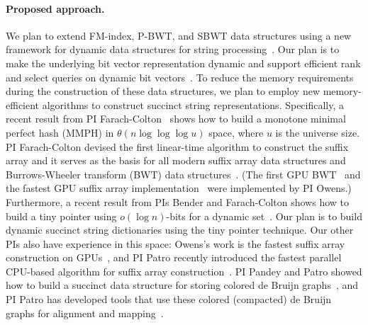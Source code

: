 \paragraph{Proposed approach.} We plan to extend FM-index, P-BWT, and SBWT data structures using a new framework for dynamic data structures for string processing~\cite{Nicola17,Farzan2011}. Our plan is to make the underlying bit vector representation dynamic and support efficient rank and select queries on dynamic bit vectors~\cite{Raman2001}.
To reduce the memory requirements during the construction of these data structures, we plan to employ new memory-efficient algorithms to construct succinct string representations. Specifically, a recent result from PI Farach-Colton~\cite{Assadi2023} shows how to build a monotone minimal perfect hash (MMPH) in $\theta(n \log{\log{\log u}})$ space, where $u$ is the universe size.
%
PI Farach-Colton devised the first linear-time algorithm to construct the suffix array and it serves as the basis for all modern suffix array data structures and Burrows-Wheeler transform (BWT) data structures~\cite{Farach97,Ambainis97}. (The first GPU BWT~\cite{Patel:2012:PLD} and the fastest GPU suffix array implementation~\cite{Wang:2016:FPS} were implemented by PI Owens.) Furthermore, a recent result from PIs Bender and Farach-Colton shows how to build a tiny pointer using $o(\log{n})$-bits for a dynamic set~\cite{Bender2023}. Our plan is to build dynamic succinct string dictionaries using the tiny pointer technique. Our other PIs also have experience in this space:
Owens's work is the fastest suffix array construction on GPUs~\cite{Wang:2016:FPS}, and PI Patro recently introduced the fastest parallel CPU-based algorithm for suffix array construction~\cite{Khan2023CapsSA}. PI Pandey and Patro showed how to build a succinct data structure for storing colored de Bruijn graphs~\cite{almodaresi2017rainbowfish}, and PI Patro has developed tools that use these colored (compacted) de Bruijn graphs for alignment and mapping~\cite{Almodaresi2018Pufferfish,Almodaresi2021,fan2023fulgor,Pibiri2023MacDBG,he2022alevin}.